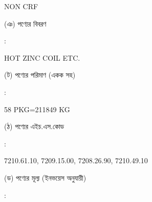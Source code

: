 \documentclass[12pt]{article}
\newcommand{\good}{HOT ZINC COIL ETC.}
\newcommand{\pkg}{58 PKG=211849 KG}
\newcommand{\hscode}{7210.61.10, 7209.15.00, 7208.26.90, 7210.49.10}
\newcommand{\crf}{NON CRF}
\newcommand{\crfdt}{}
\begin{document}
\begin{minipage}[t]{0.53\linewidth}
{\crf} \hspace{2em} {\crfdt}
\\
\end{minipage}
\begin{minipage}[t]{0.05\linewidth}
\hspace*{1em}
\end{minipage}
\begin{minipage}[t]{0.40\linewidth}
(ঞ) পণ্যের বিবরণ
\end{minipage}
\begin{minipage}[t]{0.02\linewidth}
:
\end{minipage}
\begin{minipage}[t]{0.53\linewidth}
{\good}
\\
\end{minipage}
\begin{minipage}[t]{0.05\linewidth}
\hspace*{1em}
\end{minipage}
\begin{minipage}[t]{0.40\linewidth}
(ট) পণ্যের পরিমাণ (একক সহ)
\end{minipage}
\begin{minipage}[t]{0.02\linewidth}
:
\end{minipage}
\begin{minipage}[t]{0.53\linewidth}
{\pkg}
\\
\end{minipage}
\begin{minipage}[t]{0.05\linewidth}
\hspace*{1em}
\end{minipage}
\begin{minipage}[t]{0.40\linewidth}
(ঠ) পণ্যের এইচ.এস.কোড
\end{minipage}
\begin{minipage}[t]{0.02\linewidth}
:
\end{minipage}
\begin{minipage}[t]{0.53\linewidth}
{\hscode}
\\
\end{minipage}
\begin{minipage}[t]{0.05\linewidth}
\hspace*{1em}
\end{minipage}
\begin{minipage}[t]{0.40\linewidth}
(ড) পণ্যের মূল্য (ইনভয়েস অনুযায়ী)
\end{minipage}
\begin{minipage}[t]{0.02\linewidth}
:
\end{minipage}
\end{document}
